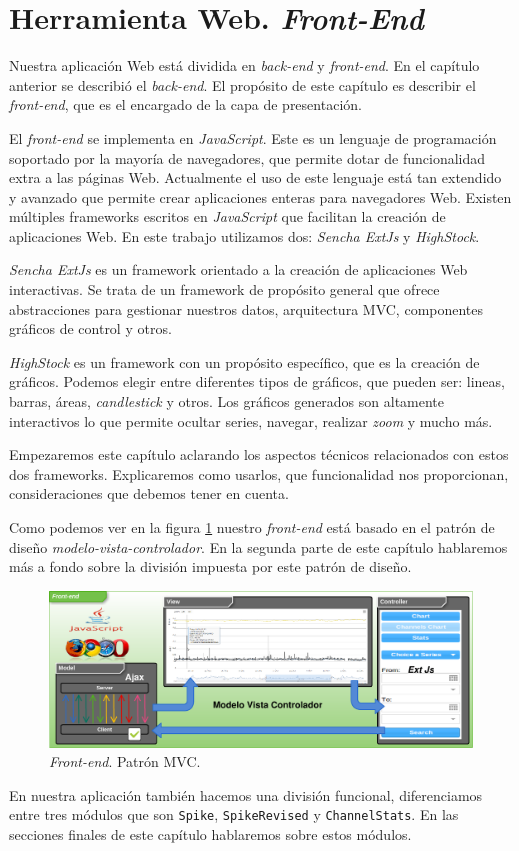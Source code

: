 \chapter{Herramienta Web. \emph{Front-End}}
\label{frontend}
Nuestra aplicación Web está dividida en \emph{back-end} y \emph{front-end}. En el capítulo anterior se describió el \emph{back-end}. El propósito de
este capítulo es describir el \emph{front-end}, que es el encargado de la capa de presentación.
\par
El \emph{front-end} se implementa en \emph{JavaScript}\cite{JavaScript}. Este es un lenguaje de programación soportado por la mayoría de navegadores, que
permite dotar de funcionalidad extra a las páginas Web. Actualmente el uso de este lenguaje está tan extendido y avanzado que permite crear
aplicaciones enteras para navegadores Web. Existen múltiples frameworks escritos en \emph{JavaScript} que facilitan la creación de aplicaciones Web. En este
trabajo utilizamos dos: \emph{Sencha ExtJs}\cite{ExtJs} y \emph{HighStock}\cite{HighStock}.
\par
\emph{Sencha ExtJs} es un framework orientado a la creación de aplicaciones Web interactivas. Se trata de un framework de propósito general que ofrece
abstracciones para gestionar nuestros datos, arquitectura MVC, componentes gráficos de control y otros. 
\par
\emph{HighStock} es un framework con un propósito específico, que es la creación de gráficos. Podemos elegir entre diferentes tipos de gráficos, que pueden
ser: lineas, barras, áreas, \emph{candlestick} y otros. Los gráficos generados son altamente interactivos lo que permite ocultar series, navegar,
realizar \emph{zoom} y mucho más.
\par
Empezaremos este capítulo aclarando los aspectos técnicos relacionados con estos dos frameworks. Explicaremos como usarlos, que funcionalidad nos
proporcionan, consideraciones que debemos tener en cuenta.
\par
Como podemos ver en la figura \ref{frontend} nuestro \emph{front-end} está basado en el patrón de diseño
\emph{modelo-vista-controlador}\cite{MVCWiki}. En la segunda parte de este capítulo hablaremos más a fondo sobre la división impuesta por este patrón
de diseño.
\begin{figure}[h]
	\centering
	\includegraphics[keepaspectratio, width=1\textwidth]{./img/frontend.png}
	\caption{\emph{Front-end}. Patrón MVC.}   
	\label{fig:frontend}
\end{figure}
\par
En nuestra aplicación también hacemos una división funcional, diferenciamos entre tres módulos que son \texttt{Spike}, \texttt{SpikeRevised} y
\texttt{ChannelStats}. En las secciones finales de este capítulo hablaremos sobre estos módulos. 


